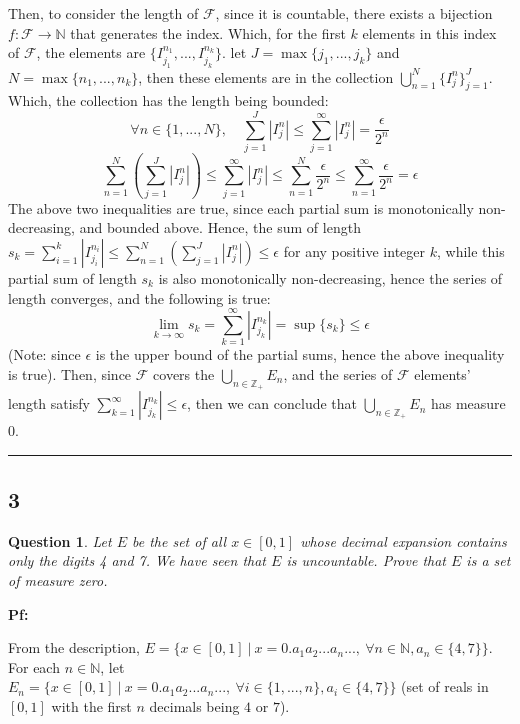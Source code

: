 \documentclass{article}
\newtheorem{question}{Question}
\begin{document}
Then, to consider the length of $\mathcal{F}$, since it is countable, there exists a bijection $f:\mathcal{F}\rightarrow \mathbb{N}$ that generates the index.
Which, for the first $k$ elements in this index of $\mathcal{F}$, the elements are $\{I_{j_1}^{n_1},...,I_{j_k}^{n_k}\}$. let $J=\max\{j_1,...,j_k\}$ and $N=\max\{n_1,...,n_k\}$,
then these elements are in the collection $\bigcup_{n=1}^{N}\{I_j^n\}_{j=1}^{J}$. Which, the collection has the length being bounded:
$$\forall n\in\{1,...,N\},\quad \sum_{j=1}^{J}|I_j^n|\leq \sum_{j=1}^{\infty}|I_j^n|=\frac{\epsilon}{2^n}$$
$$\sum_{n=1}^{N}\left(\sum_{j=1}^{J}|I_j^n|\right) \leq \sum_{j=1}^{\infty}|I_j^n| \leq \sum_{n=1}^{N}\frac{\epsilon}{2^n}\leq \sum_{n=1}^{\infty}\frac{\epsilon}{2^n}=\epsilon$$
The above two inequalities are true, since each partial sum is monotonically non-decreasing, and bounded above.
Hence, the sum of length $s_k=\sum_{i=1}^{k}|I_{j_i}^{n_i}| \leq \sum_{n=1}^{N}\left(\sum_{j=1}^{J}|I_j^n|\right) \leq \epsilon$ for any positive integer $k$, while this partial sum of length $s_k$
is also monotonically non-decreasing, hence the series of length converges, and the following is true:
$$\lim_{k\rightarrow\infty}s_k=\sum_{k=1}^{\infty}|I_{j_k}^{n_k}| = \sup\{s_k\} \leq \epsilon$$
(Note: since $\epsilon$ is the upper bound of the partial sums, hence the above inequality is true).
Then, since $\mathcal{F}$ covers the $\bigcup_{n\in\mathbb{Z}_+}E_n$, and the series of $\mathcal{F}$ elements' length satisfy $\sum_{k=1}^{\infty}|I_{j_k}^{n_k}|\leq \epsilon$, then we can conclude that $\bigcup_{n\in\mathbb{Z}_+}E_n$ has measure $0$.

\hfill

\rule{15.5cm}{0.1mm}

\break

\subsection*{3}
\begin{myBox2}[]{}
    \begin{question}
        Let $ E$ be the set of all $x\in[0,1]$ whose decimal expansion contains
        only the digits 4 and 7. We have seen that $E$ is uncountable. Prove that $E$ is a
        set of measure zero.
    \end{question}
\end{myBox2}

\textbf{Pf:}

From the description, $E=\{x\in[0,1]\ |\ x=0.a_1a_2...a_n...,\ \forall n\in\mathbb{N}, a_n\in\{4,7\}\}$. 
For each $n\in\mathbb{N}$, let $E_n=\{x\in[0,1]\ |\ x=0.a_1a_2...a_n...,\ \forall i\in\{1,...,n\}, a_i\in\{4,7\}\}$ (set of reals in $[0,1]$ with the first $n$ decimals being $4$ or $7$).
\end{document}

